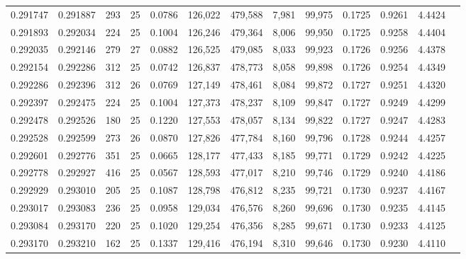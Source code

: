 \begin{tabular}{rrrrrrrrrrrrr}
0.291747 & 0.291887 &   293 &  25 &                                     0.0786 & 126,022 & 479,588 &   7,981 &  99,975 & 0.1725 & 0.9261 & 4.4424 \\
0.291893 & 0.292034 &   224 &  25 &                                     0.1004 & 126,246 & 479,364 &   8,006 &  99,950 & 0.1725 & 0.9258 & 4.4404 \\
0.292035 & 0.292146 &   279 &  27 &                                     0.0882 & 126,525 & 479,085 &   8,033 &  99,923 & 0.1726 & 0.9256 & 4.4378 \\
0.292154 & 0.292286 &   312 &  25 &                                     0.0742 & 126,837 & 478,773 &   8,058 &  99,898 & 0.1726 & 0.9254 & 4.4349 \\
0.292286 & 0.292396 &   312 &  26 &                                     0.0769 & 127,149 & 478,461 &   8,084 &  99,872 & 0.1727 & 0.9251 & 4.4320 \\
0.292397 & 0.292475 &   224 &  25 &                                     0.1004 & 127,373 & 478,237 &   8,109 &  99,847 & 0.1727 & 0.9249 & 4.4299 \\
0.292478 & 0.292526 &   180 &  25 &                                     0.1220 & 127,553 & 478,057 &   8,134 &  99,822 & 0.1727 & 0.9247 & 4.4283 \\
0.292528 & 0.292599 &   273 &  26 &                                     0.0870 & 127,826 & 477,784 &   8,160 &  99,796 & 0.1728 & 0.9244 & 4.4257 \\
0.292601 & 0.292776 &   351 &  25 &                                     0.0665 & 128,177 & 477,433 &   8,185 &  99,771 & 0.1729 & 0.9242 & 4.4225 \\
0.292778 & 0.292927 &   416 &  25 &                                     0.0567 & 128,593 & 477,017 &   8,210 &  99,746 & 0.1729 & 0.9240 & 4.4186 \\
0.292929 & 0.293010 &   205 &  25 &                                     0.1087 & 128,798 & 476,812 &   8,235 &  99,721 & 0.1730 & 0.9237 & 4.4167 \\
0.293017 & 0.293083 &   236 &  25 &                                     0.0958 & 129,034 & 476,576 &   8,260 &  99,696 & 0.1730 & 0.9235 & 4.4145 \\
0.293084 & 0.293170 &   220 &  25 &                                     0.1020 & 129,254 & 476,356 &   8,285 &  99,671 & 0.1730 & 0.9233 & 4.4125 \\
0.293170 & 0.293210 &   162 &  25 &                                     0.1337 & 129,416 & 476,194 &   8,310 &  99,646 & 0.1730 & 0.9230 & 4.4110 \\

\end{tabular}
